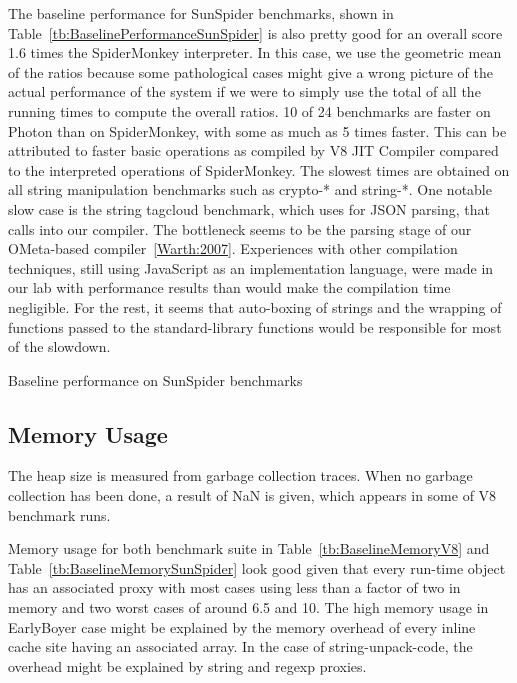 The baseline performance for SunSpider benchmarks, shown in
Table~\ref{tb:BaselinePerformanceSunSpider} is also pretty good for an overall
score 1.6 times the SpiderMonkey interpreter. In this case, we use the
geometric mean of the ratios because some pathological cases might give a wrong
picture of the actual performance of the system if we were to simply use the
total of all the running times to compute the overall ratios.  10 of 24
benchmarks are faster on Photon than on SpiderMonkey, with some as much as 5
times faster. This can be attributed to faster basic operations as compiled by
V8 JIT Compiler compared to the interpreted operations of SpiderMonkey. The
slowest times are obtained on all string manipulation benchmarks such as
crypto-* and string-*. One notable slow case is the string tagcloud benchmark,
which uses  for JSON parsing, that calls into our compiler.  The
bottleneck seems to be the parsing stage of our OMeta-based compiler~\ref{Warth:2007}.
Experiences with other compilation techniques, still using JavaScript as an
implementation language, were made in our lab with performance results than
would make the compilation time negligible. For the rest, it seems that
auto-boxing of strings and the wrapping of functions passed to the
standard-library functions would be responsible for most of the slowdown.


\begin{table}[htb]
\caption{Baseline performance on SunSpider benchmarks}
\centering
    
\label{tb:BaselinePerformanceSunSpider}
\end{table}

\subsection{Memory Usage}
The heap size is measured from garbage collection traces. When no garbage
collection has been done, a result of NaN is given, which appears in some of V8
benchmark runs.

Memory usage for both benchmark suite in Table~\ref{tb:BaselineMemoryV8} and
Table~\ref{tb:BaselineMemorySunSpider} look good given that every run-time
object has an associated proxy with most cases using less than a factor of two
in memory and two worst cases of around 6.5 and 10. The high memory usage in
EarlyBoyer case might be explained by the memory overhead of every inline cache
site having an associated array. In the case of string-unpack-code, the
overhead might be explained by string and regexp proxies.


